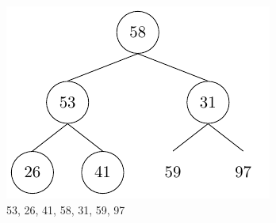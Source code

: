 \begin{center}
\begin{minipage}{0.32\textwidth}
  \begin{figure}[H]
    \centering
    \includegraphics[width=\textwidth]{Figure/HeapSort3.pdf}
    \caption*{53, 26, 41, 58, 31, 59, 97}
  \end{figure}
\end{minipage}
\end{center}

